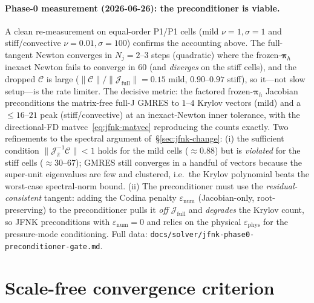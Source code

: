 \documentclass{article}
\newcommand{\code}[1]{\texttt{\small #1}}
\begin{document}
\paragraph{Phase-0 measurement (2026-06-26): the preconditioner is
viable.} A clean re-measurement on equal-order P1/P1 cells (mild
$\nu{=}1,\sigma{=}1$ and stiff/convective $\nu{=}0.01,\sigma{=}100$) confirms
the accounting above. The full-tangent Newton converges in $N_j = 2$--$3$
steps (quadratic) where the frozen-$\boldsymbol{\pi}_h$ inexact Newton fails
to converge in $60$ (and \emph{diverges} on the stiff cells), and the dropped
$\mathcal{C}$ is large ($\|\mathcal{C}\|/\|\mathcal{J}_{\mathrm{full}}\| =
0.15$ mild, $0.90$--$0.97$ stiff), so it---not slow setup---is the rate
limiter. The decisive metric: the factored frozen-$\boldsymbol{\pi}_h$
Jacobian preconditions the matrix-free full-J GMRES to $1$--$4$ Krylov vectors
(mild) and a $\le 16$--$21$ peak (stiff/convective) at an inexact-Newton inner
tolerance, with the directional-FD matvec~\eqref{eq:jfnk-matvec} reproducing the
counts exactly. Two refinements to the spectral argument
of~\S\ref{sec:jfnk-change}: (i) the sufficient condition
$\|\mathcal{J}_{\bar\pi}^{-1}\mathcal{C}\| < 1$ holds for the mild cells
($\approx 0.88$) but is \emph{violated} for the stiff cells
($\approx 30$--$67$); GMRES still converges in a handful of vectors because the
super-unit eigenvalues are few and clustered, i.e.\ the Krylov polynomial beats
the worst-case spectral-norm bound. (ii) The preconditioner must use the
\emph{residual-consistent} tangent: adding the Codina penalty
$\varepsilon_{\mathrm{num}}$ (Jacobian-only, root-preserving) to the
preconditioner pulls it \emph{off} $\mathcal{J}_{\mathrm{full}}$ and
\emph{degrades} the Krylov count, so JFNK preconditions with
$\varepsilon_{\mathrm{num}}{=}0$ and relies on the physical
$\varepsilon_{\mathrm{phys}}$ for the pressure-mode conditioning. Full data:
\code{docs/solver/jfnk-phase0-preconditioner-gate.md}.

\section{Scale-free convergence criterion}
\label{sec:convergence-criterion}
\end{document}
